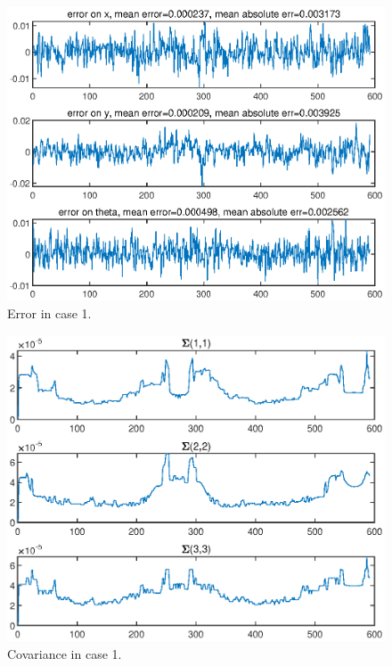 \documentclass[11pt,a4paper]{article}
\begin{document}
\begin{figure}[H]
	\centering
	\includegraphics[width=0.9\columnwidth]{Figure/Case_1_Figure_2.eps}
	\caption{Error in case 1.}
	\label{fig:Case_1_Figure_2}
\end{figure}

\begin{figure}[H]
	\centering
	\includegraphics[width=0.9\columnwidth]{Figure/Case_1_Figure_3.eps}
	\caption{Covariance in case 1.}
	\label{fig:Case_1_Figure_3}
\end{figure}

\newpage
\end{document}
